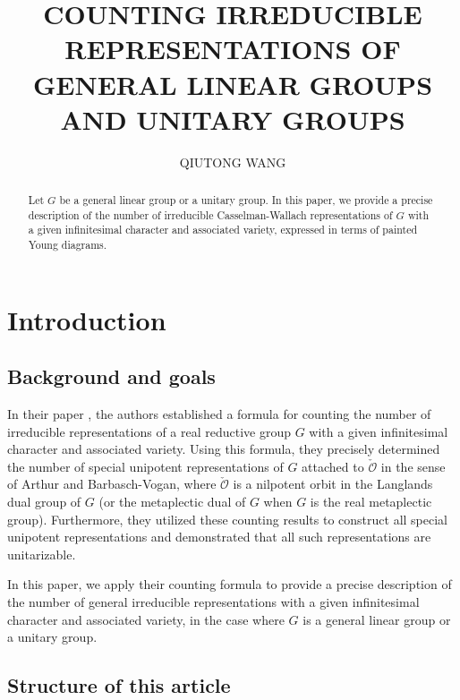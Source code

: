 \documentclass[12pt, a4paper]{amsart}
\author[QIUTONG WANG]{QIUTONG WANG}
\numberwithin{equation}{section}
\newcommand{\CO}{{\mathcal {O}}}
\begin{document}
\title[COUNTING IRREDUCIBLE REPRESENTATIONS]{COUNTING IRREDUCIBLE REPRESENTATIONS OF GENERAL LINEAR GROUPS AND UNITARY GROUPS}
\maketitle

\begin{abstract}
    Let $G$ be a general linear group or a unitary group. In this paper, we provide a precise description of the number of irreducible Casselman-Wallach representations of $G$ with a given infinitesimal character and associated variety, expressed in terms of painted Young diagrams.
\end{abstract}

\tableofcontents



\section{Introduction}

\subsection{Background and goals}

In their paper \cite{BMSZ}, the authors established a formula for counting the number of irreducible representations of a real reductive group $G$ with a given infinitesimal character and associated variety. Using this formula, they precisely determined the number of special unipotent representations of $G$ attached to $\check{\CO}$ in the sense of Arthur and Barbasch-Vogan, where $\check{\CO}$ is a nilpotent orbit in the Langlands dual group of $G$ (or the metaplectic dual of $G$ when $G$ is the real metaplectic group). Furthermore, they utilized these counting results to construct all special unipotent representations and demonstrated that all such representations are unitarizable.

In this paper, we apply their counting formula to provide a precise description of the number of general irreducible representations with a given infinitesimal character and associated variety, in the case where $G$ is a general linear group or a unitary group.

\subsection{Structure of this article}
\end{document}
